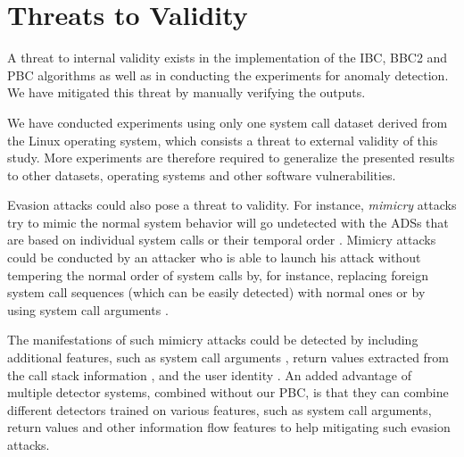 \section{Threats to Validity}
\label{sec:threat-validity}

A threat to internal validity exists in the implementation of the IBC, BBC2 and PBC algorithms as well as in conducting the experiments for anomaly detection.
We have mitigated this threat by manually verifying the outputs.

We have conducted experiments using only one system call dataset derived from the Linux operating system, which consists a threat to external validity of this study.
More experiments are therefore required to generalize the presented results to other datasets, operating systems and other software vulnerabilities.

Evasion attacks could also pose a threat to validity.
For instance, \textit{mimicry} attacks try to mimic the normal system behavior will go undetected with the ADSs that are based on individual system calls or their temporal order \cite{Wagner2002}.
Mimicry attacks could be conducted by an attacker who is able to launch his attack without tempering the normal order of system calls by, for instance, replacing foreign system call sequences (which can be easily detected) with normal ones or by using system call arguments  \cite{Wagner2002}.

The manifestations of such mimicry attacks could be detected by including additional features, such as system call arguments \cite{Bhatkar2006}, return values extracted from the call stack information \cite{Feng2003}, and the user identity \cite{Larson2009}.
An added advantage of multiple detector systems, combined without our PBC, is that they can combine different detectors trained on various features, such as system call arguments, return values and other information flow features to help mitigating such evasion attacks.

